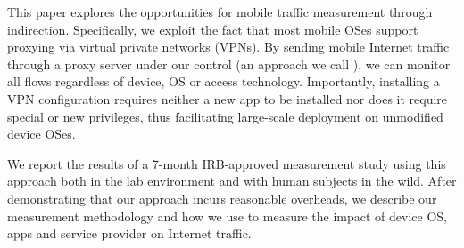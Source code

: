 This paper explores the opportunities for mobile traffic measurement through indirection. 
Specifically, we exploit the fact that most mobile OSes support proxying via virtual private networks (VPNs). 
By sending mobile Internet traffic through a proxy server under our control (an approach we call \platname), we can monitor all flows regardless of device, OS or access technology. 
Importantly, installing a VPN configuration requires neither a new app to be installed nor does it require special or new privileges, thus facilitating large-scale deployment on unmodified device OSes.

We report the results of a 7-month IRB-approved measurement study using this approach both in the lab environment and with human subjects in the wild. 
After demonstrating that our approach incurs reasonable overheads, we describe our measurement methodology and how we use \platname to measure the impact of device OS, apps and service provider on Internet traffic.


